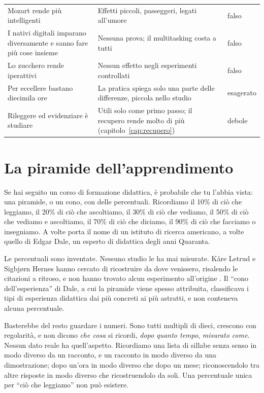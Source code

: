 \begin{longtable}{@{}>{\raggedright\arraybackslash}p{}>{\raggedright\arraybackslash}p{}>{\raggedright\arraybackslash}p{}@{}}
    \addlinespace
    Mozart rende più intelligenti
      & Effetti piccoli, passeggeri, legati all'umore
      & falso \\
    \addlinespace
    I nativi digitali imparano diversamente e sanno fare più cose insieme
      & Nessuna prova; il multitasking costa a tutti
      & falso \\
    \addlinespace
    Lo zucchero rende iperattivi
      & Nessun effetto negli esperimenti controllati
      & falso \\
    \addlinespace
    Per eccellere bastano diecimila ore
      & La pratica spiega solo una parte delle differenze, piccola
        nello studio
      & esagerato \\
    \addlinespace
    Rileggere ed evidenziare è studiare
      & Utili solo come primo passo; il recupero rende molto di più
        (capitolo~\ref{cap:recupero})
      & debole \\
\end{longtable}
\endgroup

\section{La piramide dell'apprendimento}

Se hai seguito un corso di formazione didattica, è probabile che
tu l'abbia vista: una piramide, o un cono, con delle percentuali.
Ricordiamo il 10\% di ciò che leggiamo, il 20\% di ciò che ascoltiamo,
il 30\% di ciò che vediamo, il 50\% di ciò che vediamo e ascoltiamo,
il 70\% di ciò che diciamo, il 90\% di ciò che facciamo o insegniamo.
A volte porta il nome di un istituto di ricerca americano, a volte
quello di Edgar Dale, un esperto di didattica degli anni Quaranta.

Le percentuali sono inventate. Nessuno studio le ha mai misurate.
Kåre Letrud e Sigbjørn Hernes hanno cercato di ricostruire da dove
venissero, risalendo le citazioni a ritroso, e non hanno trovato alcun
esperimento all'origine \parencite{letrud2018}. Il \enquote{cono
dell'esperienza} di Dale, a cui la piramide viene spesso attribuita,
classificava i tipi di esperienza didattica dai più concreti ai più
astratti, e non conteneva alcuna percentuale.

Basterebbe del resto guardare i numeri. Sono tutti multipli di dieci,
crescono con regolarità, e non dicono \emph{che cosa} si ricordi,
\emph{dopo quanto tempo}, \emph{misurato come}. Nessun dato reale ha
quell'aspetto. Ricordiamo una lista di sillabe senza senso in modo
diverso da un racconto, e un racconto in modo diverso da una
dimostrazione; dopo un'ora in modo diverso che dopo un mese;
riconoscendolo tra altre risposte in modo diverso che ricostruendolo
da soli. Una percentuale unica per \enquote{ciò che leggiamo} non
può esistere.

